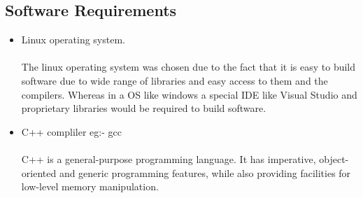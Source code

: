 \documentclass[11pt]{report}
\begin{document}
\subsection{Software Requirements}
\begin{itemize}
    \item Linux operating system.
    \\
    \\The linux operating system was chosen due to the fact that it is easy to build software due to wide range of libraries and easy access to them and the compilers. Whereas in a OS like windows a special IDE like Visual Studio and proprietary libraries would be required to build software.
    \item C++ compliler eg:- gcc
    \\
    \\C++ is a general-purpose programming language. It has imperative, object-oriented and generic programming features, while also providing facilities for low-level memory manipulation.


\end{itemize}
\end{document}
